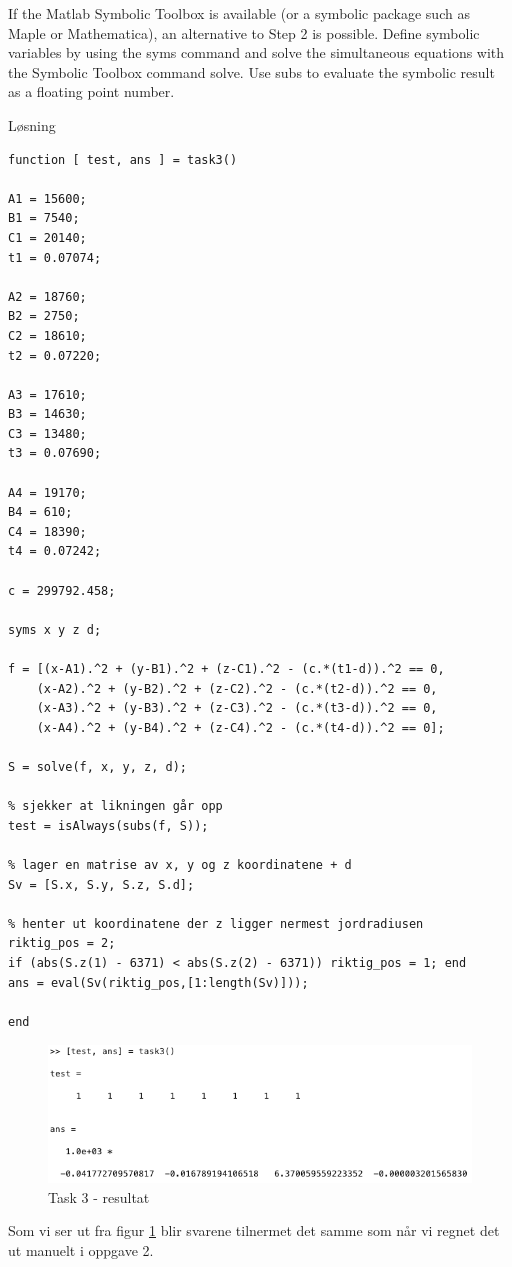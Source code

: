 % 

If the Matlab Symbolic Toolbox is available (or a symbolic package such as Maple
or Mathematica), an alternative to Step 2 is possible. Define symbolic variables by using the syms command and solve the simultaneous equations with the Symbolic Toolbox command solve. Use subs to evaluate the symbolic result as a floating point number.

\vspace{5mm}

Løsning


\begin{lstlisting}[caption={Task3.m}]
function [ test, ans ] = task3()

A1 = 15600;
B1 = 7540;
C1 = 20140;
t1 = 0.07074;

A2 = 18760;
B2 = 2750;
C2 = 18610;
t2 = 0.07220;

A3 = 17610;
B3 = 14630;
C3 = 13480;
t3 = 0.07690;

A4 = 19170;
B4 = 610;
C4 = 18390;
t4 = 0.07242;

c = 299792.458;

syms x y z d;

f = [(x-A1).^2 + (y-B1).^2 + (z-C1).^2 - (c.*(t1-d)).^2 == 0,
    (x-A2).^2 + (y-B2).^2 + (z-C2).^2 - (c.*(t2-d)).^2 == 0, 
    (x-A3).^2 + (y-B3).^2 + (z-C3).^2 - (c.*(t3-d)).^2 == 0, 
    (x-A4).^2 + (y-B4).^2 + (z-C4).^2 - (c.*(t4-d)).^2 == 0];

S = solve(f, x, y, z, d);

% sjekker at likningen går opp
test = isAlways(subs(f, S));

% lager en matrise av x, y og z koordinatene + d
Sv = [S.x, S.y, S.z, S.d];

% henter ut koordinatene der z ligger nermest jordradiusen
riktig_pos = 2;
if (abs(S.z(1) - 6371) < abs(S.z(2) - 6371)) riktig_pos = 1; end
ans = eval(Sv(riktig_pos,[1:length(Sv)]));

end
\end{lstlisting}

\begin{figure}[h]
    \centering
    \includegraphics[width=1\textwidth]{task3result}
    \caption{Task 3 - resultat}
    \label{fig:task3result}
\end{figure}

Som vi ser ut fra figur \ref{fig:task3result} blir svarene tilnermet det samme som når vi regnet det ut manuelt i oppgave 2.

% 